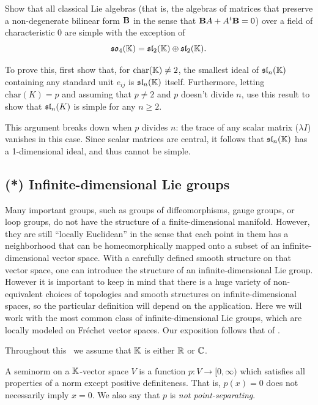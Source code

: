 \begin{xca}
    Show that all classical Lie algebras (that is, the algebras of matrices that preserve a non-degenerate bilinear form $\bf{B}$ in the sense that $\bf{B}A+A^t\bf{B}=0$) over a field of characteristic 0 are simple with the exception of
    \[\frakso_4(\bbK)=\fraksl_2(\bbK)\oplus\fraksl_2(\bbK).\]

    To prove this, first show that, for $\mathrm{char}(\bbK)\neq 2$, the smallest ideal of $\fraksl_n(\bbK)$ containing any standard unit $e_{ij}$ is $\fraksl_n(\bbK)$ itself. Furthermore, letting $\mathrm{char}(K)=p$ and assuming that $p\neq 2$ and $p$ doesn't divide $n$, use this result to show that $\fraksl_n(K)$ is simple for any $n\geq 2$. 

    This argument breaks down when $p$ divides $n$: the trace of any scalar matrix ($\lambda I$) vanishes in this case. Since scalar matrices are central, it follows that $\fraksl_n(\bbK)$ has a 1-dimensional ideal, and thus cannot be simple.
\end{xca}






\subsection{(*) Infinite-dimensional Lie groups}\label{sec: inf-dim groups}


Many important groups, such as groups of diffeomorphisms, gauge groups, or loop groups, do not have the structure of a finite-dimensional manifold. However, they are still ``locally Euclidean'' in the sense that each point in them has a neighborhood that can be homeomorphically mapped onto a subset of an infinite-dimensional vector space. With a carefully defined smooth structure on that vector space, one can introduce the structure of an infinite-dimensional Lie group. However it is important to keep in mind that there is a huge variety of non-equivalent choices of topologies and smooth structures on infinite-dimensional spaces, so the particular definition will depend on the application. Here we will work with the most common class of infinite-dimensional Lie groups, which are locally modeled on Fr\'echet vector spaces. Our exposition follows that of \cite{Neeb}.

Throughout this \subsect\  we assume that $\bbK$ is either $\bbR$ or $\bbC$.

\begin{defn}[Seminorm]
    A seminorm on a $\bbK$-vector space $V$ is a function $p:V\to [0,\infty)$ which satisfies all properties of a norm except positive definiteness. That is, $p(x)=0$ does not necessarily imply $x=0$. We also say that $p$ is \emph{not point-separating}.
\end{defn}

